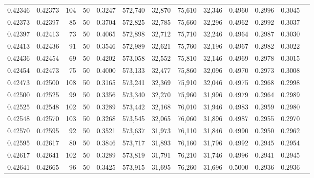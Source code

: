 \begin{tabular}{rrrrrrrrrrrrr}
0.42346 & 0.42373 &   104 &  50 &                                     0.3247 & 572,740 &  32,870 &  75,610 &  32,346 & 0.4960 & 0.2996 & 0.3045 \\
0.42373 & 0.42397 &    85 &  50 &                                     0.3704 & 572,825 &  32,785 &  75,660 &  32,296 & 0.4962 & 0.2992 & 0.3037 \\
0.42397 & 0.42413 &    73 &  50 &                                     0.4065 & 572,898 &  32,712 &  75,710 &  32,246 & 0.4964 & 0.2987 & 0.3030 \\
0.42413 & 0.42436 &    91 &  50 &                                     0.3546 & 572,989 &  32,621 &  75,760 &  32,196 & 0.4967 & 0.2982 & 0.3022 \\
0.42436 & 0.42454 &    69 &  50 &                                     0.4202 & 573,058 &  32,552 &  75,810 &  32,146 & 0.4969 & 0.2978 & 0.3015 \\
0.42454 & 0.42473 &    75 &  50 &                                     0.4000 & 573,133 &  32,477 &  75,860 &  32,096 & 0.4970 & 0.2973 & 0.3008 \\
0.42473 & 0.42500 &   108 &  50 &                                     0.3165 & 573,241 &  32,369 &  75,910 &  32,046 & 0.4975 & 0.2968 & 0.2998 \\
0.42500 & 0.42525 &    99 &  50 &                                     0.3356 & 573,340 &  32,270 &  75,960 &  31,996 & 0.4979 & 0.2964 & 0.2989 \\
0.42525 & 0.42548 &   102 &  50 &                                     0.3289 & 573,442 &  32,168 &  76,010 &  31,946 & 0.4983 & 0.2959 & 0.2980 \\
0.42548 & 0.42570 &   103 &  50 &                                     0.3268 & 573,545 &  32,065 &  76,060 &  31,896 & 0.4987 & 0.2955 & 0.2970 \\
0.42570 & 0.42595 &    92 &  50 &                                     0.3521 & 573,637 &  31,973 &  76,110 &  31,846 & 0.4990 & 0.2950 & 0.2962 \\
0.42595 & 0.42617 &    80 &  50 &                                     0.3846 & 573,717 &  31,893 &  76,160 &  31,796 & 0.4992 & 0.2945 & 0.2954 \\
0.42617 & 0.42641 &   102 &  50 &                                     0.3289 & 573,819 &  31,791 &  76,210 &  31,746 & 0.4996 & 0.2941 & 0.2945 \\
0.42641 & 0.42665 &    96 &  50 &                                     0.3425 & 573,915 &  31,695 &  76,260 &  31,696 & 0.5000 & 0.2936 & 0.2936 \\

\end{tabular}
